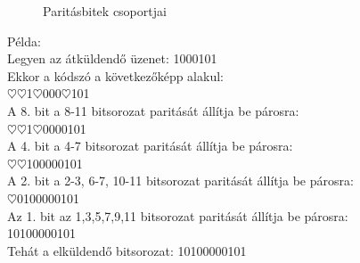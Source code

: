 \documentclass[margin=0px]{article}
\begin{document}
\begin{description}
\begin{itemize}
\begin{figure}[H]
                      \caption{Paritásbitek csoportjai}
                  \end{figure}
                  Példa:\\
                  Legyen az átküldendő üzenet: 1000101 \\
                  Ekkor a kódszó a következőképp alakul: \\
                  {\color[rgb]{1,0,0}$\heartsuit\heartsuit$}1{\color[rgb]{1,0,0}$\heartsuit$}000{\color[rgb]{1,0,0}$\heartsuit$}101\\
                  A 8. bit a 8-11  bitsorozat paritását állítja be párosra:\\
                  {\color[rgb]{1,0,0}$\heartsuit\heartsuit$}1{\color[rgb]{1,0,0}$\heartsuit$}000{\color[rgb]{0,0,1}0101}\\
                  A 4. bit a 4-7  bitsorozat paritását állítja be párosra:\\
                  {\color[rgb]{1,0,0}$\heartsuit\heartsuit$}1{\color[rgb]{0,0,1}0000}0101\\
                  A 2. bit a 2-3, 6-7, 10-11 bitsorozat paritását állítja be párosra:\\
                  {\color[rgb]{1,0,0}$\heartsuit$}{\color[rgb]{0,0,1}01}00{\color[rgb]{0,0,1}00}01{\color[rgb]{0,0,1}01}\\
                  Az 1. bit az 1,3,5,7,9,11 bitsorozat paritását állítja be párosra: \\
                  {\color[rgb]{0,0,1}1}0{\color[rgb]{0,0,1}1}0{\color[rgb]{0,0,1}0}0{\color[rgb]{0,0,1}0}0{\color[rgb]{0,0,1}1}0{\color[rgb]{0,0,1}1}\\

                  Tehát a elküldendő bitsorozat:
                  {\color[rgb]{1,0,0}10}1{\color[rgb]{1,0,0}0}000{\color[rgb]{1,0,0}0}101\\


\end{itemize}
\end{description}
\end{document}
